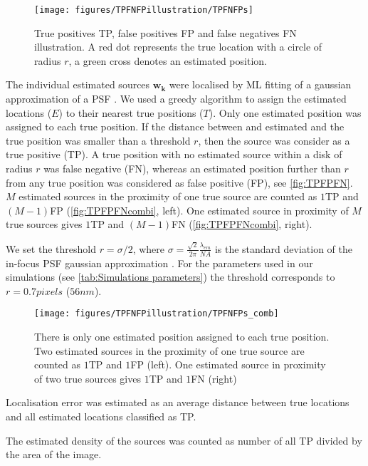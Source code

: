 \begin{figure}[!h]
	\centering
	\texttt{[image: figures/TPFNFPillustration/TPFNFPs]}
	\caption{True positives TP, false positives FP and false negatives FN illustration. A red dot represents the true location with a circle of radius $r$, a green cross denotes an estimated position.}
	\label{fig:TPFPFN}
\end{figure}

The individual estimated sources $\bm{w_{k}}$ were localised by ML fitting of a gaussian approximation of a PSF \cite{Zhang2007}. We used a greedy algorithm to assign the estimated locations ($E$) to their nearest true positions ($T$). Only one estimated position was assigned to each true position. If the distance between and estimated and the true position was smaller than a threshold $r$, then the source was consider as a true positive (TP). A true position with no estimated source within a disk of radius $r$ was false negative (FN), whereas an estimated position further than $r$ from any true position was considered as false positive (FP), see \autoref{fig:TPFPFN}. $M$ estimated sources in the proximity of one true source are counted as $1$TP and $(M-1)$FP (\autoref{fig:TPFPFNcombi}, left). One estimated source in proximity of $M$ true sources gives $1$TP and $(M-1)$FN (\autoref{fig:TPFPFNcombi}, right).

We set the threshold $r=\sigma/2$, where $\sigma=\frac{\sqrt{2}}{2\pi}\frac{\lambda_{em}}{NA}$ is the standard deviation of the in-focus PSF gaussian approximation \cite{Zhang2007}. For the parameters used in our simulations (see \autoref{tab:Simulations parameters}) the threshold corresponds to $r=0.7\unit{pixels}$ ($56\unit{nm}$). 

\begin{figure}[!h]
	\centering
	\texttt{[image: figures/TPFNFPillustration/TPFNFPs\_comb]}
	\caption{There is only one estimated position assigned to each true position. Two estimated sources in the proximity of one true source are counted as $1$TP and $1$FP (left). One estimated source in proximity of two true sources gives $1$TP and $1$FN (right)}
	\label{fig:TPFPFNcombi}
\end{figure}

Localisation error was estimated as an average distance between true locations and all estimated locations classified as TP. 

The estimated density of the sources was counted as number of all TP divided by the area of the image.

